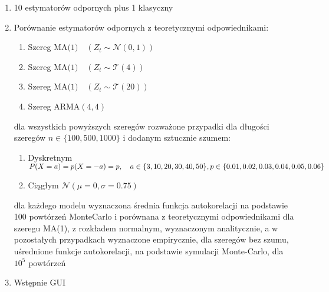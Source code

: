 \documentclass[12pt]{mwart}
\begin{document}
	\begin{enumerate}
		\item 10 estymatorów odpornych plus 1 klasyczny
		\item Porównanie estymatorów odpornych z teoretycznymi odpowiednikami:
		\begin{enumerate}
			\item Szereg \(\text{MA(1)}\quad(Z_t\sim\mathcal{N}(0, 1))\)
			\item Szereg \(\text{MA(1)}\quad(Z_t\sim\mathcal{T}(4))\)
			\item Szereg \(\text{MA(1)}\quad(Z_t\sim\mathcal{T}(20))\)
			\item Szereg \(\text{ARMA}(4, 4)\)
		\end{enumerate}
		dla wszystkich powyższych szeregów rozważone przypadki dla długości szeregów \(n\in\{100, 500, 1000\}\) i dodanym sztucznie szumem:
		\begin{enumerate}
			\item Dyskretnym \pauza \(P(X=a)=p(X=-a)=p,\quad a\in\{3, 10, 20, 30, 40, 50\},\quad\\p\in\{0.01, 0.02, 0.03, 0.04, 0.05, 0.06\}\)
			\item Ciągłym \pauza \(\mathcal{N}(\mu=0, \sigma=0.75)\)
		\end{enumerate}
		dla każdego modelu wyznaczona średnia funkcja autokorelacji na podstawie 100 powtórzeń Monte{\dywiz}Carlo i porównana z teoretycznymi odpowiednikami \pauza dla szeregu MA(1), z rozkładem normalnym, wyznaczonym analitycznie, a w pozostałych przypadkach wyznaczone empirycznie, dla szeregów bez szumu, uśrednione funkcje autokorelacji, na podstawie symulacji Monte-Carlo, dla $10^5$ powtórzeń
		\item Wstępnie GUI
	\end{enumerate}
\end{document}
